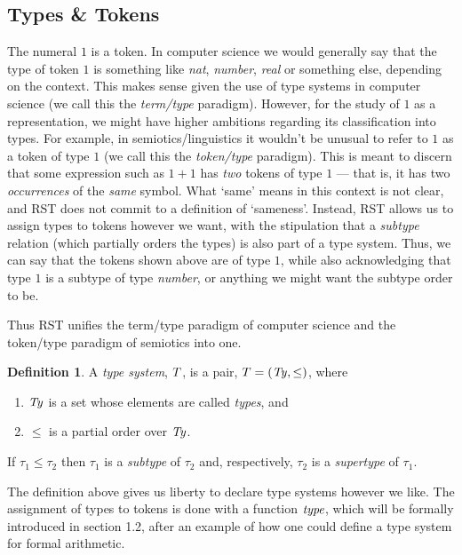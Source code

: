 \documentclass[a4paper]{article}
\theoremstyle{definition}
\newtheorem{definition}{Definition}
\begin{document}
	\subsection{Types \& Tokens}
		The numeral $1$ is a token. In computer science we would generally say that the type of token $1$ is something like \textit{nat}, \textit{number}, \textit{real} or something else, depending on the context. This makes sense given the use of type systems in computer science (we call this the \textit{term/type} paradigm). However, for the study of $1$ as a representation, we might have higher ambitions regarding its classification into types. For example, in semiotics/linguistics it wouldn't be unusual to refer to $1$ as a token of type $1$ (we call this the \textit{token/type} paradigm). This is meant to discern that some expression such as $1+1$ has \textit{two} tokens of type $1$ --- that is, it has two \textit{occurrences} of the \textit{same} symbol. What `same' means in this context is not clear, and RST does not commit to a definition of `sameness'. Instead, RST allows us to assign types to tokens however we want, with the stipulation that a \textit{subtype} relation (which partially orders the types) is also part of a type system. Thus, we can say that the tokens shown above are of type $1$, while also acknowledging that type $1$ is a subtype of type \textit{number}, or anything we might want the subtype order to be.

		Thus RST unifies the term/type paradigm of computer science and the token/type paradigm of semiotics into one.

		\begin{definition}\label{defn:typeSystem}
			A \textit{type system}, $T$,  is a pair, $T=(\mathit{Ty},\leq)$,
			where
			\begin{enumerate}[itemsep=0pt,topsep=4pt]
				\item $\mathit{Ty}$ is a set whose elements are called \textit{types}, and
				\item $\leq$ is a partial order over $\mathit{Ty}$.
			\end{enumerate}
			If $\tau_1\leq \tau_2$ then $\tau_1$ is a \textit{subtype} of $\tau_2$ and, respectively, $\tau_2$ is a \textit{supertype} of $\tau_1$.
		\end{definition}

		The definition above gives us liberty to declare type systems however we like. The assignment of types to tokens is done with a function $\mathit{type}$, which will be formally introduced in section 1.2, after an example of how one could define a type system for formal arithmetic.
\end{document}
